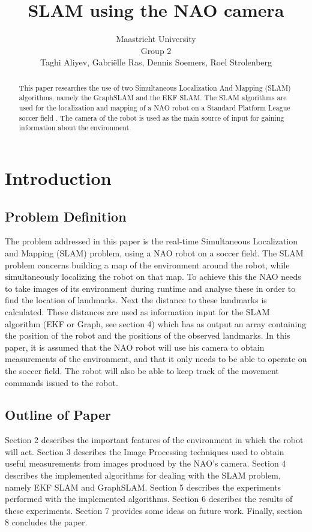 \documentclass{ba-kecs}
\title{SLAM using the NAO camera}
\author{Maastricht University \\ Group 2 \\ Taghi Aliyev, Gabri\"elle Ras, Dennis Soemers, Roel Strolenberg}
\numberwithin{figure}{section}
\numberwithin{equation}{section}
\begin{document}
\maketitle


\begin{abstract}

This paper researches the use of two Simultaneous Localization And Mapping (SLAM) algorithms, namely the GraphSLAM and the EKF SLAM. The SLAM algorithms are used for the localization and mapping of a NAO robot on a Standard Platform League soccer field \cite{cd1}. The camera of the robot is used as the main source of input for gaining information about the environment. 


\end{abstract}


\section{Introduction}


\subsection{Problem Definition}
The problem addressed in this paper is the real-time Simultaneous Localization and Mapping (SLAM) problem, using a NAO robot on a soccer field. The SLAM problem concerns building a map of the environment around the robot, while simultaneously localizing the robot on that map. To achieve this the NAO needs to take images of its environment during runtime and analyse these in order to find the location of landmarks. Next the distance to these landmarks is calculated. These distances are used as information input for the SLAM algorithm (EKF or Graph, see section 4) which has as output an array containing the position of the robot and the positions of the observed landmarks.
	In this paper, it is assumed that the NAO robot will use his camera to obtain measurements of the environment, and that it only needs to be able to operate on the soccer field. The robot will also be able to keep track of the movement commands issued to the robot.


\subsection{Outline of Paper}
Section 2 describes the important features of the environment in which the robot will act. Section 3 describes the Image Processing techniques used to obtain useful measurements from images produced by the NAO's camera. Section 4 describes the implemented algorithms for dealing with the SLAM problem, namely EKF SLAM and GraphSLAM.  Section 5 describes the experiments performed with the implemented algorithms. Section 6 describes the results of these experiments. Section 7 provides some ideas on future work. Finally, section 8 concludes the paper.
\end{document}
